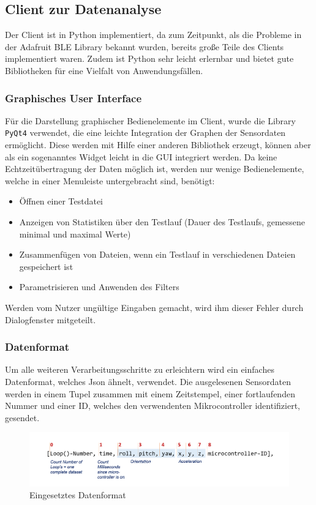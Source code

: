\subsection{Client zur Datenanalyse}

Der Client ist in Python implementiert, da zum Zeitpunkt, als die Probleme in der Adafruit BLE Library bekannt wurden, bereits große Teile des Clients implementiert waren. Zudem ist Python sehr leicht erlernbar und bietet gute Bibliotheken für eine Vielfalt von Anwendungsfällen.
\subsubsection{Graphisches User Interface}
Für die Darstellung graphischer Bedienelemente im Client, wurde die Library \texttt{PyQt4} verwendet, die eine leichte Integration der Graphen der Sensordaten ermöglicht. Diese werden mit Hilfe einer anderen Bibliothek erzeugt, können aber als ein sogenanntes Widget leicht in die GUI integriert werden.
Da keine Echtzeitübertragung der Daten möglich ist, werden nur wenige Bedienelemente, welche in einer Menuleiste untergebracht sind, benötigt:
\begin{itemize}
\item Öffnen einer Testdatei
\item Anzeigen von Statistiken über den Testlauf (Dauer des Testlaufs, gemessene minimal und maximal Werte)
\item Zusammenfügen von Dateien, wenn ein Testlauf in verschiedenen Dateien gespeichert ist
\item Parametrisieren und Anwenden des Filters
\end{itemize}
Werden vom Nutzer ungültige Eingaben gemacht, wird ihm dieser Fehler durch Dialogfenster mitgeteilt. 
\subsubsection{Datenformat}
Um alle weiteren Verarbeitungsschritte zu erleichtern wird ein einfaches Datenformat, welches Json ähnelt, verwendet. Die ausgelesenen Sensordaten werden in einem Tupel zusammen mit einem Zeitstempel, einer fortlaufenden Nummer und einer ID, welches den verwendenten Mikrocontroller identifiziert, gesendet.
\begin{figure}[h]
	\centering
	\includegraphics[width=1\textwidth]{images/k3-datenformat.png}
	\caption {Eingesetztes Datenformat}
	\label{fig:k3-datenformat.png} 
\end{figure}
